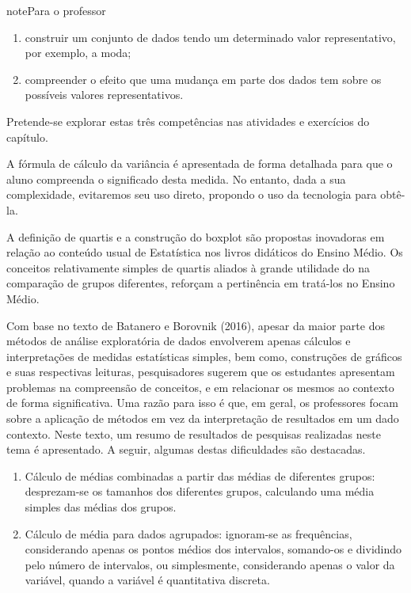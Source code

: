 \begin{sphinxadmonition}{note}{Para o professor}
\begin{enumerate}
\item {} 
construir um conjunto de dados tendo um determinado valor representativo, por exemplo, a moda;

\item {} 
compreender o efeito que uma mudança em parte dos dados tem sobre os possíveis valores representativos.

\end{enumerate}

Pretende-se explorar estas três competências nas atividades e exercícios do capítulo.

A fórmula de cálculo da variância é apresentada de forma detalhada  para que o aluno compreenda o significado desta medida. No entanto, dada a sua complexidade, evitaremos seu uso direto, propondo o uso da tecnologia para obtê-la.

A definição de quartis e a construção do boxplot são propostas inovadoras em relação ao conteúdo usual de Estatística nos livros didáticos do Ensino Médio. Os conceitos relativamente simples de quartis aliados  à grande utilidade do  na comparação de grupos diferentes, reforçam a pertinência em tratá-los no Ensino Médio.


Com base no texto de Batanero e Borovnik (2016), apesar da maior parte dos métodos de análise exploratória de dados envolverem apenas cálculos e interpretações de medidas estatísticas simples, bem como, construções de gráficos e suas respectivas leituras, pesquisadores sugerem que os estudantes apresentam problemas na compreensão de conceitos, e em relacionar os mesmos ao contexto de forma significativa. Uma razão para isso é que, em geral, os professores focam sobre a aplicação de métodos em vez da interpretação de resultados em um dado contexto. Neste texto, um resumo de resultados de pesquisas realizadas neste tema é apresentado. A seguir, algumas destas dificuldades são destacadas.
\begin{enumerate}
\item {} 
Cálculo de médias combinadas a partir das médias de diferentes grupos: desprezam-se os tamanhos dos diferentes grupos,  calculando uma média simples das médias dos grupos.

\item {} 
Cálculo de média para dados agrupados: ignoram-se as frequências, considerando apenas os pontos médios dos intervalos, somando-os e dividindo pelo número de intervalos, ou simplesmente, considerando apenas o valor da variável, quando a variável é quantitativa discreta.


\end{enumerate}
\end{sphinxadmonition}
